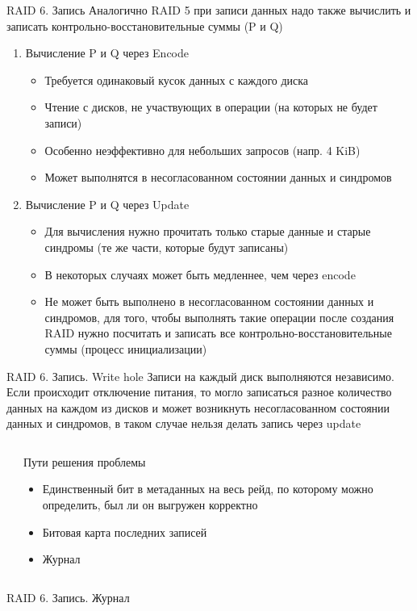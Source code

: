 \documentclass[aspectratio=169]{beamer}
\begin{document}
\begin{frame}{RAID 6. Запись}
Аналогично RAID 5 при записи данных надо также вычислить и записать контрольно-восстановительные суммы (P и Q)
\begin{enumerate}
    \item Вычисление P и Q через Encode
    \begin{itemize}
        \item Требуется одинаковый кусок данных с каждого диска
        \item Чтение с дисков, не участвующих в операции (на которых не будет записи)
        \item Особенно неэффективно для небольших запросов (напр. 4 KiB)
        \item Может выполнятся в несогласованном состоянии данных и синдромов
    \end{itemize}
    \item Вычисление P и Q через Update
    \begin{itemize}
        \item Для вычисления нужно прочитать только старые данные и старые синдромы (те же части, которые будут записаны)    
        \item В некоторых случаях может быть медленнее, чем через encode
        \item Не может быть выполнено в несогласованном состоянии данных и синдромов, для того, чтобы выполнять такие операции после создания RAID нужно посчитать и записать все контрольно-восстановительные суммы (процесс инициализации)
    \end{itemize}
\end{enumerate}
\end{frame}

\begin{frame}{RAID 6. Запись. Write hole}
    Записи на каждый диск выполняются независимо. Если происходит отключение питания, то могло записаться разное количество данных на каждом из дисков и может возникнуть несогласованном состоянии данных и синдромов, в таком случае нельзя делать запись через update
    \begin{columns}
        \begin{column}{.54\textwidth}
            \writehole
        \end{column}
        \begin{column}{.42\textwidth}
        
        \vspace{1em}
        Пути решения проблемы
            \begin{itemize}
                \item Единственный бит в метаданных на весь рейд, по которому можно определить, был ли он выгружен корректно
                \item Битовая карта последних записей
                \item Журнал
            \end{itemize}
        \end{column}
    \end{columns}
    
\end{frame}

\begin{frame}{RAID 6. Запись. Журнал}
\journal

\end{frame}
\end{document}
